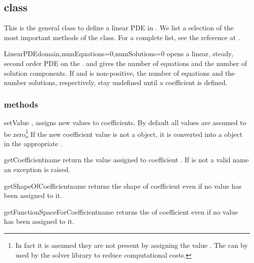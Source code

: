\subsection{\LinearPDE class}
This is the general class to define a linear PDE in \escript. We list a selection of the most
important methods of the class. For a complete list, see the reference at \ReferenceGuide.

\begin{classdesc}{LinearPDE}{domain,numEquations=0,numSolutions=0}
opens a linear, steady, second order PDE on the \Domain {}. 
and  gives the number of equations and the number of solution components.
If  and  is non-positive, the number of equations
and the number solutions, respectively, stay undefined until a coefficient is
defined.
\end{classdesc}

\subsubsection{\LinearPDE methods}

\begin{methoddesc}[LinearPDE]{setValue}{
,
}
assigns new values to coefficients. By default all values are assumed to be zero\footnote{
In fact it is assumed they are not present by assigning the value . The
can by used by the solver library to reduce computational costs.
}
If the new coefficient value is not a \Data object, it is converted into a \Data object in the
appropriate \FunctionSpace.
\end{methoddesc}

\begin{methoddesc}[LinearPDE]{getCoefficient}{name}
return the value assigned to coefficient . If  is not a valid name
an exception is raised.
\end{methoddesc}

\begin{methoddesc}[LinearPDE]{getShapeOfCoefficient}{name}
returns the shape of coefficient  even if no value has been assigned to it.
\end{methoddesc}

\begin{methoddesc}[LinearPDE]{getFunctionSpaceForCoefficient}{name}
returns the \FunctionSpace of coefficient  even if no value has been assigned to it.
\end{methoddesc}

